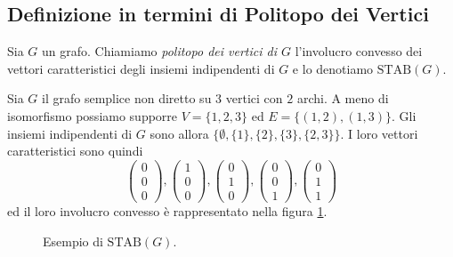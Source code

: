 \subsection{Definizione in termini di Politopo dei Vertici} 
\begin{definition}
	Sia \(G\) un grafo. Chiamiamo \emph{politopo dei vertici di \(G\)} l'involucro convesso dei vettori caratteristici degli insiemi indipendenti di \(G\) e lo denotiamo \(\text{STAB}(G)\). 
\end{definition}
\begin{example}
	Sia \(G\) il grafo semplice non diretto su \(3\) vertici con \(2\) archi. A meno di isomorfismo possiamo supporre \(V=\{1,2,3\}\) ed \(E=\{(1,2),(1,3)\}\). Gli insiemi indipendenti di \(G\) sono allora \(\{\emptyset , \{1\}, \{2\}, \{3\}, \{2,3\}\}\). I loro vettori caratteristici sono quindi
	\[ \left( 
	\begin{array}{c}
		0\\0\\0 
	\end{array}
	\right) , \left( 
	\begin{array}{c}
		1\\0\\0 
	\end{array}
	\right) , \left( 
	\begin{array}{c}
		0\\1\\0 
	\end{array}
	\right) , \left( 
	\begin{array}{c}
		0\\0\\1 
	\end{array}
	\right) , \left( 
	\begin{array}{c}
		0\\1\\1 
	\end{array}
	\right) \]
	ed il loro involucro convesso è rappresentato nella figura \ref{stabexample}. 
	\begin{figure}
		\centering 
		\caption{Esempio di \(\text{STAB}(G)\).} \label{stabexample} 
	\end{figure}
\end{example}

